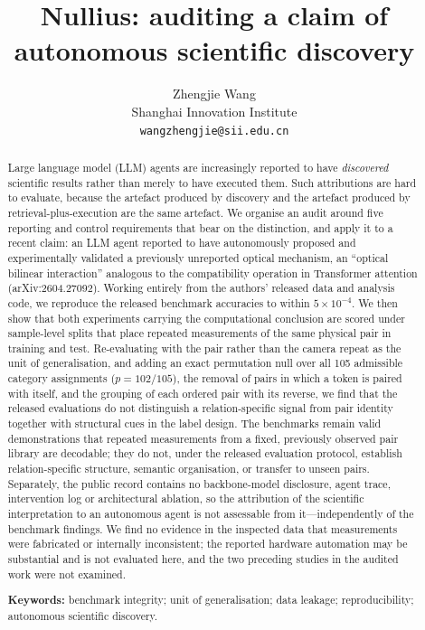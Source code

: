 \documentclass[11pt,a4paper]{article}
\title{\bfseries Nullius: auditing a claim of autonomous scientific discovery}
\author{Zhengjie Wang\\[2pt]
\small Shanghai Innovation Institute\\
\small \texttt{wangzhengjie@sii.edu.cn}}
\date{}
\newcommand{\target}{arXiv:2604.27092}
\begin{document}
\maketitle

\begin{abstract}
\noindent
Large language model (LLM) agents are increasingly reported to have
\emph{discovered} scientific results rather than merely to have executed
them. Such attributions are hard to evaluate, because the artefact produced by
discovery and the artefact produced by retrieval-plus-execution are the same
artefact. We organise an audit around five reporting and control requirements
that bear on the distinction, and apply it to a recent
claim: an LLM agent reported to have autonomously proposed and experimentally
validated a previously unreported optical mechanism, an ``optical bilinear
interaction'' analogous to the compatibility operation in Transformer
attention (\target{}). Working entirely from the authors' released data and
analysis code, we reproduce the released benchmark accuracies to within
$5\times10^{-4}$. We then show that both experiments carrying the
computational conclusion are scored under sample-level splits that place
repeated measurements of the same physical pair in training and test.
Re-evaluating with the pair rather than the camera repeat as the unit of
generalisation, and adding an exact permutation null over all 105 admissible
category assignments ($p = 102/105$), the removal of pairs in which a token is
paired with itself, and the grouping of each ordered pair with its reverse, we
find that the released evaluations do not distinguish a relation-specific
signal from pair identity together with structural cues in the label design. The
benchmarks remain valid demonstrations that repeated measurements from a
fixed, previously observed pair library are decodable; they do not, under the
released evaluation protocol, establish relation-specific structure, semantic
organisation, or transfer to unseen pairs. Separately, the public record
contains no backbone-model disclosure, agent trace, intervention log or
architectural ablation, so the attribution of the scientific interpretation to
an autonomous agent is not assessable from it---independently of the benchmark
findings. We find no evidence in the inspected data that measurements were
fabricated or internally inconsistent; the reported hardware automation may be
substantial and is not evaluated here, and the two preceding studies in the
audited work were not examined.

\vspace{0.7em}
\noindent\textbf{Keywords:} benchmark integrity; unit of generalisation; data
leakage; reproducibility; autonomous scientific discovery.
\end{abstract}
\end{document}
